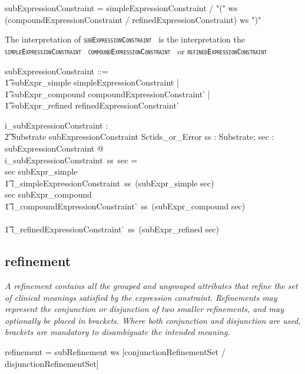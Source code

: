 \documentclass{article}
\def\spec#1{{\tt \small \textsc{{#1}} }}
\def\bnf#1{{\scriptsize {{#1}} }}
\def\desc#1{{\small \textsl{{#1}} }}
\begin{document}
\begin{framed}
\noindent
\bnf{subExpressionConstraint = simpleExpressionConstraint / "(" ws (compoundExpressionConstraint / refinedExpressionConstraint)  ws ")"}
\end{framed}

The interpretation of \spec{subExpressionConstraint} is  the interpretation the \spec{simpleExpressionConstraint} \spec{compoundExpressionConstraint} or \spec{refinedExpressionConstraint}

\begin{zed}
subExpressionConstraint ::= \\
\t1 subExpr\_simple \ldata simpleExpressionConstraint \rdata | \\
\t1 subExpr\_compound \ldata compoundExpressionConstraint' \rdata | \\
\t1 subExpr\_refined \ldata refinedExpressionConstraint' \rdata
\end{zed}

\begin{gendef}
   i\_subExpressionConstraint : \\
\t2 Substrate \fun subExpressionConstraint \fun Sctids\_or\_Error
\where
   \forall ss : Substrate; sec : subExpressionConstraint @ \\
i\_subExpressionConstraint~ss~sec = \\
   \IF sec \in \ran subExpr\_simple \THEN \\
   \t1 i\_simpleExpressionConstraint~ss~(subExpr\_simple \inv sec) \\
    \ELSE \IF sec \in \ran subExpr\_compound \THEN \\
    \t1 i\_compoundExpressionConstraint'~ss~(subExpr\_compound \inv sec) \\
    \ELSE \\
    \t1 i\_refinedExpressionConstraint'~ss~(subExpr\_refined \inv sec) 
\end{gendef}

\subsection{refinement}
\begin{framed}
\desc{A refinement contains all the grouped and ungrouped attributes that refine the set of clinical meanings satisfied by the expression constraint. Refinements may represent the conjunction or disjunction of two smaller refinements, and may optionally be placed in brackets. Where both conjunction and disjunction are used, brackets are mandatory to disambiguate the intended meaning.}
\end{framed}
\begin{framed}
\noindent
\bnf{refinement = subRefinement ws [conjunctionRefinementSet / disjunctionRefinementSet]}
\end{framed}
\end{document}
